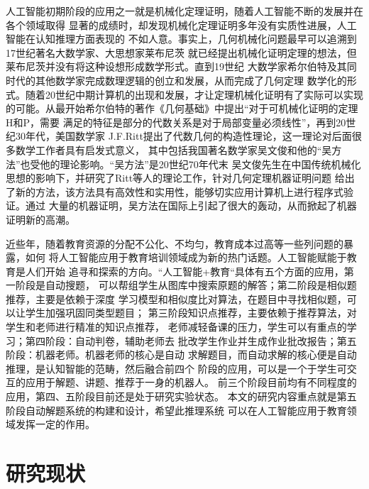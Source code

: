 \documentclass{standalone}
\begin{document}
人工智能初期阶段的应用之一就是机械化定理证明，随着人工智能不断的发展并在各个领域取得
显著的成绩时，却发现机械化定理证明多年没有实质性进展，人工智能在认知推理方面表现的
不如人意。事实上，几何机械化问题最早可以追溯到17世纪著名大数学家、大思想家莱布尼茨
就已经提出机械化证明定理的想法，但莱布尼茨并没有将这种设想形成数学形式。直到19世纪
大数学家希尔伯特及其同时代的其他数学家完成数理逻辑的创立和发展，从而完成了几何定理
数学化的形式。随着20世纪中期计算机的出现和发展，才让定理机械化证明有了实际可以实现
的可能。从最开始希尔伯特的著作《几何基础》中提出“对于可机械化证明的定理H和P，需要
满足的特征是部分的代数关系是对于局部变量必须线性”，再到20世纪30年代，美国数学家
J.F.Ritt提出了代数几何的构造性理论，这一理论对后面很多数学工作者具有启发式意义，
其中包括我国著名数学家吴文俊和他的“吴方法”也受他的理论影响。“吴方法”是20世纪70年代末
吴文俊先生在中国传统机械化思想的影响下，并研究了Ritt等人的理论工作，针对几何定理机器证明问题
给出了新的方法，该方法具有高效性和实用性，能够切实应用计算机上进行程序式验证。通过
大量的机器证明，吴方法在国际上引起了很大的轰动，从而掀起了机器证明新的高潮。


近些年，随着教育资源的分配不公化、不均匀，教育成本过高等一些列问题的暴露，如何
将人工智能应用于教育培训领域成为新的热门话题。人工智能赋能于教育是人们开始
追寻和探索的方向。“人工智能+教育“具体有五个方面的应用，第一阶段是自动搜题，
可以帮组学生从图库中搜索原题的解答；第二阶段是相似题推荐，主要是依赖于深度
学习模型和相似度比对算法，在题目中寻找相似题，可以让学生加强巩固同类型题目；
第三阶段知识点推荐，主要依赖于推荐算法，对学生和老师进行精准的知识点推荐，
老师减轻备课的压力，学生可以有重点的学习；第四阶段：自动判卷，辅助老师去
批改学生作业并生成作业批改报告；第五阶段：机器老师。机器老师的核心是自动
求解题目，而自动求解的核心便是自动推理，是认知智能的范畴，然后融合前四个
阶段的应用，可以是一个于学生可交互的应用于解题、讲题、推荐于一身的机器人。
前三个阶段目前均有不同程度的应用，第四、五阶段目前还是处于研究实验状态。
本文的研究内容重点就是第五阶段自动解题系统的构建和设计，希望此推理系统
可以在人工智能应用于教育领域发挥一定的作用。



\section{研究现状}
\end{document}
